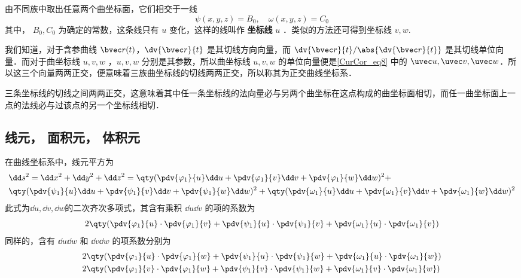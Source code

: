 由不同族中取出任意两个曲坐标面，它们相交于一线
\begin{equation}
\psi(x,y,z)=B_0,\quad \omega(x,y,z)=C_0
\end{equation}
其中， $B_0,C_0$ 为确定的常数，这条线只有 $u$ 变化，这样的线叫作 \textbf{坐标线} $u$ ．类似的方法还可得到坐标线 $v,w$.

我们知道，对于含参曲线 $\bvec r(t)$，$\dv{\bvec r}{t}$ 是其切线方向向量，而 $\dv{\bvec r}{t}/\abs{\dv{\bvec r}{t}}$ 是其切线单位向量．而对于曲坐标线 $u,v,w$ ，$u,v,w$ 分别是其参数，所以曲坐标线 $u,v,w$ 的单位向量便是\autoref{CurCor_eq8} 中的 $\uvec u,\uvec v,\uvec w$．所以这三个向量两两正交，便意味着三族曲坐标线的切线两两正交，所以称其为正交曲线坐标系．

三条坐标线的切线之间两两正交，这意味着其中任一条坐标线的法向量必与另两个曲坐标在这点构成的曲坐标面相切，而任一曲坐标面上一点的法线必与过该点的另一个坐标线相切．

\subsection{线元， 面积元， 体积元}
在曲线坐标系中，线元平方为
\begin{equation}\label{CurCor_eq1}
\begin{aligned}
&\dd s^2=\dd x^2+\dd y^2+\dd z^2=\qty(\pdv{\varphi_1}{u}\dd u+\pdv{\varphi_1}{v}\dd v+\pdv{\varphi_1}{w}\dd w)^2+\\ 
&\qty(\pdv{\psi_1}{u}\dd u+\pdv{\psi_1}{v}\dd v+\pdv{\psi_1}{w}\dd w)^2+\qty(\pdv{\omega_1}{u}\dd u+\pdv{\omega_1}{v}\dd v+\pdv{\omega_1}{w}\dd w)^2
\end{aligned}
\end{equation}
此式为$\dd u,\dd v,\dd w$的二次齐次多项式，其含有乘积 $\dd u \dd v$ 的项的系数为
\begin{equation}
2\qty(\pdv{\varphi_1}{u}\cdot\pdv{\varphi_1}{v}+\pdv{\psi_1}{u}\cdot\pdv{\psi_1}{v}+\pdv{\omega_1}{u}\cdot\pdv{\omega_1}{v})
\end{equation}
同样的，含有 $\dd u\dd w$ 和 $\dd v\dd w$ 的项系数分别为
\begin{equation}
\begin{aligned}
& 2\qty(\pdv{\varphi_1}{u}\cdot\pdv{\varphi_1}{w}+\pdv{\psi_1}{u}\cdot\pdv{\psi_1}{w}+\pdv{\omega_1}{u}\cdot\pdv{\omega_1}{w})\\
&2\qty(\pdv{\varphi_1}{v}\cdot\pdv{\varphi_1}{w}+\pdv{\psi_1}{v}\cdot\pdv{\psi_1}{w}+\pdv{\omega_1}{v}\cdot\pdv{\omega_1}{w})
\end{aligned}
\end{equation}

